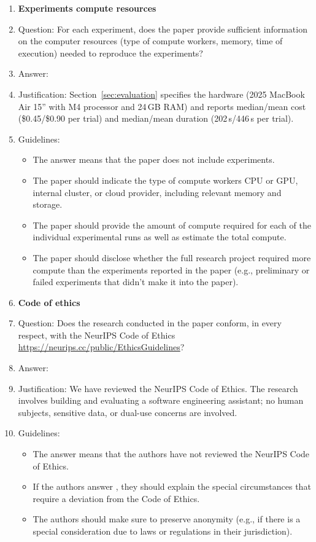 \documentclass{article}
\begin{document}
\begin{enumerate}
\item {\bf Experiments compute resources}
    \item[] Question: For each experiment, does the paper provide sufficient information on the computer resources (type of compute workers, memory, time of execution) needed to reproduce the experiments?
    \item[] Answer: \answerYes{}
    \item[] Justification: Section~\ref{sec:evaluation} specifies the hardware (2025 MacBook Air 15'' with M4 processor and 24\,GB RAM) and reports median/mean cost (\$0.45/\$0.90 per trial) and median/mean duration (202\,s/446\,s per trial).
    \item[] Guidelines:
    \begin{itemize}
        \item The answer \answerNA{} means that the paper does not include experiments.
        \item The paper should indicate the type of compute workers CPU or GPU, internal cluster, or cloud provider, including relevant memory and storage.
        \item The paper should provide the amount of compute required for each of the individual experimental runs as well as estimate the total compute. 
        \item The paper should disclose whether the full research project required more compute than the experiments reported in the paper (e.g., preliminary or failed experiments that didn't make it into the paper). 
    \end{itemize}
    
\item {\bf Code of ethics}
    \item[] Question: Does the research conducted in the paper conform, in every respect, with the NeurIPS Code of Ethics \url{https://neurips.cc/public/EthicsGuidelines}?
    \item[] Answer: \answerYes{}
    \item[] Justification: We have reviewed the NeurIPS Code of Ethics. The research involves building and evaluating a software engineering assistant; no human subjects, sensitive data, or dual-use concerns are involved.
    \item[] Guidelines:
    \begin{itemize}
        \item The answer \answerNA{} means that the authors have not reviewed the NeurIPS Code of Ethics.
        \item If the authors answer \answerNo{}, they should explain the special circumstances that require a deviation from the Code of Ethics.
        \item The authors should make sure to preserve anonymity (e.g., if there is a special consideration due to laws or regulations in their jurisdiction).
    \end{itemize}



\end{enumerate}
\end{document}
